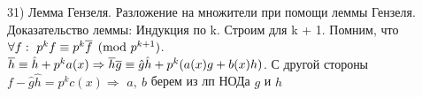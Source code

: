 31) Лемма Гензеля. Разложение на множители при помощи леммы Гензеля.\\
    Доказательство леммы: Индукция по k. Строим для k + 1. Помним, что $\forall f:~p^{k}f \equiv p^{k}\overline{f} \pmod{p^{k + 1}}$.\\
    $\overline{h} \equiv \hat{h}+p^ka(x) \Rightarrow \overline{h}\overline{g} \equiv \hat{g}\hat{h} + p^{k}(a(x)g + b(x)h)$. С другой стороны $f-\hat{g}\hat{h}=p^kc(x) \Rightarrow$ $a,~b$ берем из лп НОДа $g$ и $h$\\
